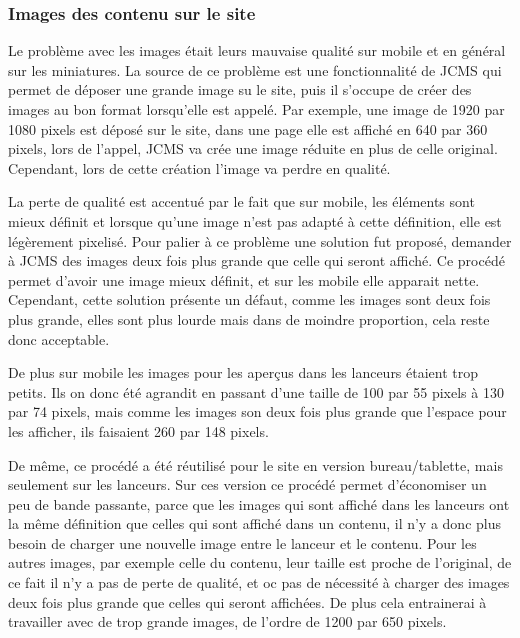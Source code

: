 \documentclass[12pt,a4paper]{article}
\begin{document}
\subsubsection{Images des contenu sur le site}
Le problème avec les images était leurs mauvaise qualité sur mobile et en général sur les miniatures. La source de ce problème est une fonctionnalité de \gls{JCMS} qui permet de déposer une grande image su le site, puis il s'occupe de créer des images au bon format lorsqu'elle est appelé. Par exemple, une image de 1920 par 1080 pixels est déposé sur le site, dans une page elle est affiché en 640 par 360 pixels, lors de l'appel, \gls{JCMS} va crée une image réduite en plus de celle original. Cependant, lors de cette création l'image va perdre en qualité.\par
\medskip
La perte de qualité est accentué par le fait que sur mobile, les éléments sont mieux définit et lorsque qu'une image n'est pas adapté à cette définition, elle est légèrement pixelisé. Pour palier à ce problème une solution fut proposé, demander à \gls{JCMS} des images deux fois plus grande que celle qui seront affiché. Ce procédé permet d'avoir une image mieux définit, et sur les mobile elle apparait nette. Cependant, cette solution présente un défaut, comme les images sont deux fois plus grande, elles sont plus lourde mais dans de moindre proportion, cela reste donc acceptable.\par
De plus sur mobile les images pour les aperçus dans les lanceurs étaient trop petits. Ils on donc été agrandit en passant d'une taille de 100 par 55 pixels à 130 par 74 pixels, mais comme les images son deux fois plus grande que l'espace pour les afficher, ils faisaient 260 par 148 pixels.\par 
De même, ce procédé a été réutilisé pour le site en version bureau/tablette, mais seulement sur les lanceurs. Sur ces version ce procédé permet d'économiser un peu de bande passante, parce que les images qui sont affiché dans les lanceurs ont la même définition que celles qui sont affiché dans un contenu, il n'y a donc plus besoin de charger une nouvelle image entre le lanceur et le contenu. Pour les autres images, par exemple celle du contenu, leur taille est proche de l'original, de ce fait il n'y a pas de perte de qualité, et oc pas de nécessité à charger des images deux fois plus grande que celles qui seront affichées. De plus cela entrainerai à travailler avec de trop grande images, de l'ordre de 1200 par 650 pixels.\par
\end{document}
